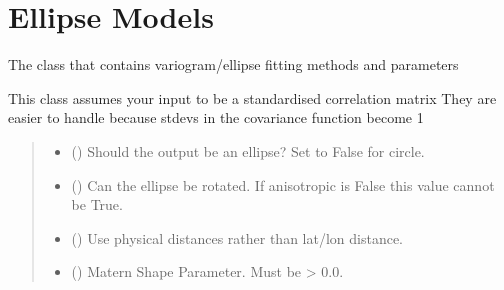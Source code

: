 \documentclass[letterpaper,10pt,english]{sphinxmanual}
\begin{document}
\section{Ellipse Models}
\label{\detokenize{ellipse:ellipse-models}}

\begin{fulllineitems}
\label{\detokenize{ellipse:glomar_gridding.ellipse.EllipseModel}}
\pysigstartsignatures
\pysiglinewithargsret
{}
{\sphinxparamcomma {}\sphinxparamcomma {}\sphinxparamcomma {}\sphinxparamcomma {}}
{}
\pysigstopsignatures
\sphinxAtStartPar
The class that contains variogram/ellipse fitting methods and parameters

\sphinxAtStartPar
This class assumes your input to be a standardised correlation matrix
They are easier to handle because stdevs in the covariance function become 1
\begin{quote}\begin{description}
\begin{itemize}
\item {}
\sphinxAtStartPar
{} () \textendash{} Should the output be an ellipse? Set to False for circle.

\item {}
\sphinxAtStartPar
{} () \textendash{} Can the ellipse be rotated. If anisotropic is False this value cannot
be True.

\item {}
\sphinxAtStartPar
{} () \textendash{} Use physical distances rather than lat/lon distance.

\item {}
\sphinxAtStartPar
{} () \textendash{} Matern Shape Parameter. Must be \textgreater{} 0.0.


\end{itemize}
\end{description}
\end{quote}
\end{fulllineitems}
\end{document}
